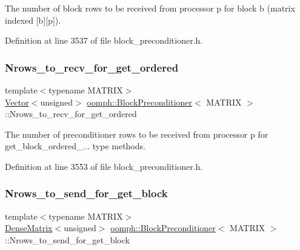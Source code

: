 The number of block rows to be received from processor p for block b (matrix indexed \mbox{[}b\mbox{]}\mbox{[}p\mbox{]}). 



Definition at line 3537 of file block\+\_\+preconditioner.\+h.

\mbox{\label{classoomph_1_1BlockPreconditioner_a0265c19418608d4a525c159abe1b5c60}} 
\subsubsection{\texorpdfstring{Nrows\+\_\+to\+\_\+recv\+\_\+for\+\_\+get\+\_\+ordered}{Nrows\_to\_recv\_for\_get\_ordered}}
{\footnotesize\ttfamily template$<$typename M\+A\+T\+R\+IX$>$ \\
\hyperlink{classoomph_1_1Vector}{Vector}$<$unsigned$>$ \hyperlink{classoomph_1_1BlockPreconditioner}{oomph\+::\+Block\+Preconditioner}$<$ M\+A\+T\+R\+IX $>$\+::Nrows\+\_\+to\+\_\+recv\+\_\+for\+\_\+get\+\_\+ordered\hspace{0.3cm}{\ttfamily [private]}}



The number of preconditioner rows to be received from processor p for get\+\_\+block\+\_\+ordered\+\_\+... type methods. 



Definition at line 3553 of file block\+\_\+preconditioner.\+h.

\mbox{\label{classoomph_1_1BlockPreconditioner_a2080668f30dd3095ce8f2f791536f20e}} 
\subsubsection{\texorpdfstring{Nrows\+\_\+to\+\_\+send\+\_\+for\+\_\+get\+\_\+block}{Nrows\_to\_send\_for\_get\_block}}
{\footnotesize\ttfamily template$<$typename M\+A\+T\+R\+IX$>$ \\
\hyperlink{classoomph_1_1DenseMatrix}{Dense\+Matrix}$<$unsigned$>$ \hyperlink{classoomph_1_1BlockPreconditioner}{oomph\+::\+Block\+Preconditioner}$<$ M\+A\+T\+R\+IX $>$\+::Nrows\+\_\+to\+\_\+send\+\_\+for\+\_\+get\+\_\+block\hspace{0.3cm}{\ttfamily [private]}}



